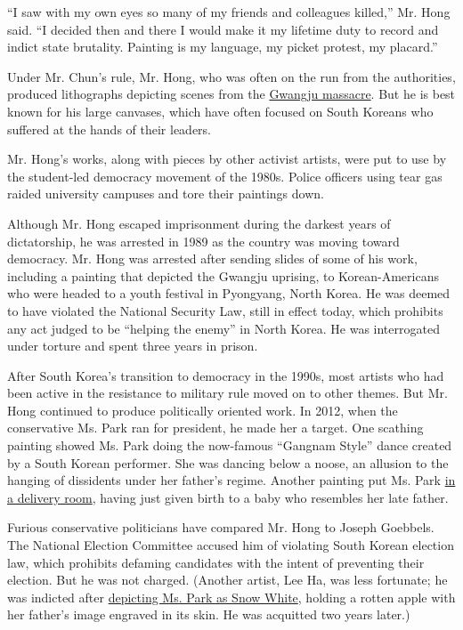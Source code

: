 ``I saw with my own eyes so many of my friends and colleagues killed,''
Mr. Hong said. ``I decided then and there I would make it my lifetime
duty to record and indict state brutality. Painting is my language, my
picket protest, my placard.''

Under Mr. Chun's rule, Mr. Hong, who was often on the run from the
authorities, produced lithographs depicting scenes from the
\href{http://www.nytimes.com/1996/08/29/world/the-people-of-kwangju-recall-1980-massacre.html}{Gwangju
massacre}. But he is best known for his large canvases, which have often
focused on South Koreans who suffered at the hands of their leaders.

Mr. Hong's works, along with pieces by other activist artists, were put
to use by the student-led democracy movement of the 1980s. Police
officers using tear gas raided university campuses and tore their
paintings down.

Although Mr. Hong escaped imprisonment during the darkest years of
dictatorship, he was arrested in 1989 as the country was moving toward
democracy. Mr. Hong was arrested after sending slides of some of his
work, including a painting that depicted the Gwangju uprising, to
Korean-Americans who were headed to a youth festival in Pyongyang, North
Korea. He was deemed to have violated the National Security Law, still
in effect today, which prohibits any act judged to be ``helping the
enemy'' in North Korea. He was interrogated under torture and spent
three years in prison.

After South Korea's transition to democracy in the 1990s, most artists
who had been active in the resistance to military rule moved on to other
themes. But Mr. Hong continued to produce politically oriented work. In
2012, when the conservative Ms. Park ran for president, he made her a
target. One scathing painting showed Ms. Park doing the now-famous
``Gangnam Style'' dance created by a South Korean performer. She was
dancing below a noose, an allusion to the hanging of dissidents under
her father's regime. Another painting put Ms. Park
\href{http://www.mediatoday.co.kr/news/articleView.html}{in a delivery
room}, having just given birth to a baby who resembles her late father.

Furious conservative politicians have compared Mr. Hong to Joseph
Goebbels. The National Election Committee accused him of violating South
Korean election law, which prohibits defaming candidates with the intent
of preventing their election. But he was not charged. (Another artist,
Lee Ha, was less fortunate; he was indicted after
\href{http://blogs.wsj.com/korearealtime/2013/05/30/pop-artist-challenges-censorship/}{depicting
Ms. Park as Snow White}, holding a rotten apple with her father's image
engraved in its skin. He was acquitted two years later.)

